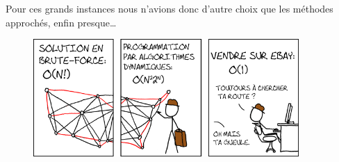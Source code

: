 Pour ces grands instances nous n'avions donc d'autre choix que les méthodes approchés, enfin presque\dots

\begin{figure}[h!]
\centering
\includegraphics[width=0.9\textwidth]{../images/salesman1.png}
\end{figure}